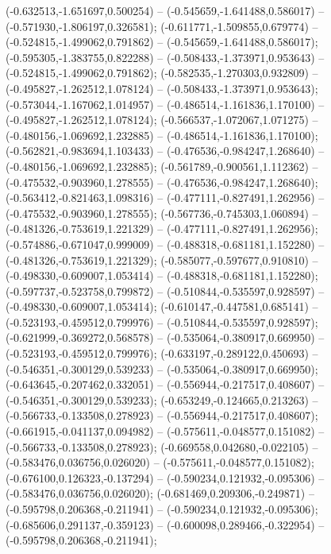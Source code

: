  (-0.632513,-1.651697,0.500254) -- (-0.545659,-1.641488,0.586017) -- (-0.571930,-1.806197,0.326581);
 (-0.611771,-1.509855,0.679774) -- (-0.524815,-1.499062,0.791862) -- (-0.545659,-1.641488,0.586017);
 (-0.595305,-1.383755,0.822288) -- (-0.508433,-1.373971,0.953643) -- (-0.524815,-1.499062,0.791862);
 (-0.582535,-1.270303,0.932809) -- (-0.495827,-1.262512,1.078124) -- (-0.508433,-1.373971,0.953643);
 (-0.573044,-1.167062,1.014957) -- (-0.486514,-1.161836,1.170100) -- (-0.495827,-1.262512,1.078124);
 (-0.566537,-1.072067,1.071275) -- (-0.480156,-1.069692,1.232885) -- (-0.486514,-1.161836,1.170100);
 (-0.562821,-0.983694,1.103433) -- (-0.476536,-0.984247,1.268640) -- (-0.480156,-1.069692,1.232885);
 (-0.561789,-0.900561,1.112362) -- (-0.475532,-0.903960,1.278555) -- (-0.476536,-0.984247,1.268640);
 (-0.563412,-0.821463,1.098316) -- (-0.477111,-0.827491,1.262956) -- (-0.475532,-0.903960,1.278555);
 (-0.567736,-0.745303,1.060894) -- (-0.481326,-0.753619,1.221329) -- (-0.477111,-0.827491,1.262956);
 (-0.574886,-0.671047,0.999009) -- (-0.488318,-0.681181,1.152280) -- (-0.481326,-0.753619,1.221329);
 (-0.585077,-0.597677,0.910810) -- (-0.498330,-0.609007,1.053414) -- (-0.488318,-0.681181,1.152280);
 (-0.597737,-0.523758,0.799872) -- (-0.510844,-0.535597,0.928597) -- (-0.498330,-0.609007,1.053414);
 (-0.610147,-0.447581,0.685141) -- (-0.523193,-0.459512,0.799976) -- (-0.510844,-0.535597,0.928597);
 (-0.621999,-0.369272,0.568578) -- (-0.535064,-0.380917,0.669950) -- (-0.523193,-0.459512,0.799976);
 (-0.633197,-0.289122,0.450693) -- (-0.546351,-0.300129,0.539233) -- (-0.535064,-0.380917,0.669950);
 (-0.643645,-0.207462,0.332051) -- (-0.556944,-0.217517,0.408607) -- (-0.546351,-0.300129,0.539233);
 (-0.653249,-0.124665,0.213263) -- (-0.566733,-0.133508,0.278923) -- (-0.556944,-0.217517,0.408607);
 (-0.661915,-0.041137,0.094982) -- (-0.575611,-0.048577,0.151082) -- (-0.566733,-0.133508,0.278923);
 (-0.669558,0.042680,-0.022105) -- (-0.583476,0.036756,0.026020) -- (-0.575611,-0.048577,0.151082);
 (-0.676100,0.126323,-0.137294) -- (-0.590234,0.121932,-0.095306) -- (-0.583476,0.036756,0.026020);
 (-0.681469,0.209306,-0.249871) -- (-0.595798,0.206368,-0.211941) -- (-0.590234,0.121932,-0.095306);
 (-0.685606,0.291137,-0.359123) -- (-0.600098,0.289466,-0.322954) -- (-0.595798,0.206368,-0.211941);
